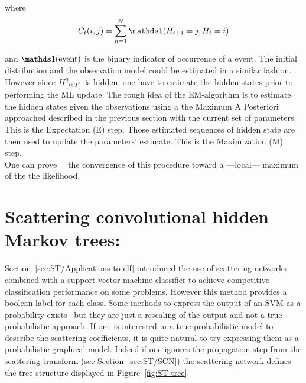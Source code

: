 \documentclass[a4paper,11pt]{report}
\begin{document}
      where 
      \begin{equation}
        C_{t}(i,j) = \sum_{n=1}^{N} \ds1(H_{t+1}=j, H_{t}=i)
        \label{eq:EM intuit transition count}
      \end{equation}
      
      and $\ds1(\text{event})$ is the binary indicator of occurrence of a event. The initial distribution and the observation model could be estimated in a similar fashion.\\
      
      However since $H_{[0:T]}^{n}$ is hidden, one have to estimate the hidden states prior to performing the ML update. The rough idea of the EM-algorithm is to estimate the hidden states given the observations using a the Maximum A Posteriori approached described in the previous section with the current set of parameters. This is the Expectation (E) step. Those estimated sequences of hidden state are then used to update the parameters' estimate. This is the Maximization (M) step.\\
      
      One can prove~\citep{baum1970maximization}~\citep{dempster1977maximum} the convergence of this procedure toward a ---local--- maximum of the the likelihood.
      
      
\chapter{Scattering convolutional hidden Markov trees:}
  \label{chap:SCHMT}
  Section~\ref{sec:ST/Applications to clf} introduced the use of scattering networks combined with a support vector machine classifier to achieve competitive classification performance on some problems. However this method provides a boolean label for each class. Some methods to express the output of an SVM as a probability exists~\citep{platt1999probabilistic} but they are just a rescaling of the output and not a true probabilistic approach. If one is interested in a true probabilistic model to describe the scattering coefficients, it is quite natural to try expressing them as a probabilistic graphical model. Indeed if one ignores the propagation step from the scattering transform (see Section~\ref{sec:ST/SCN}) the scattering network defines the tree structure displayed in Figure~\ref{fig:ST tree}. \\
\end{document}
